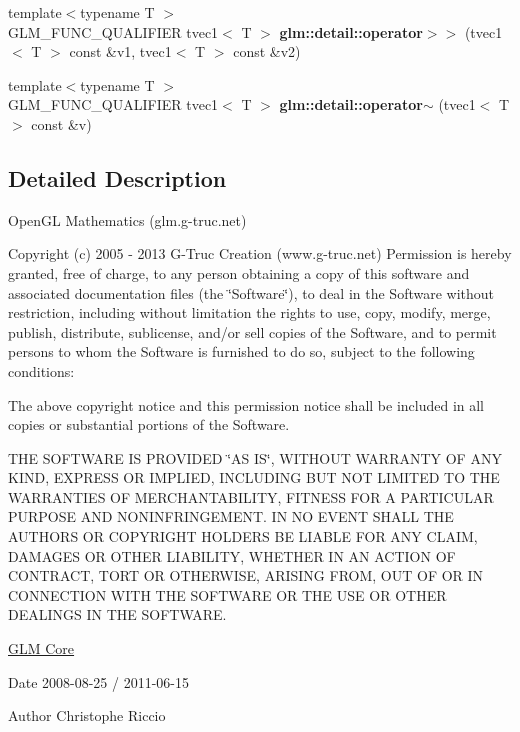 \begin{DoxyCompactItemize}
\item 
\hypertarget{namespaceglm_1_1detail_ac0a8c77debb2d3be29d2f966a35b8f29}{}{\footnotesize template$<$typename T $>$ }\\G\+L\+M\+\_\+\+F\+U\+N\+C\+\_\+\+Q\+U\+A\+L\+I\+F\+I\+E\+R tvec1$<$ T $>$ {\bfseries glm\+::detail\+::operator$>$$>$} (tvec1$<$ T $>$ const \&v1, tvec1$<$ T $>$ const \&v2)\label{namespaceglm_1_1detail_ac0a8c77debb2d3be29d2f966a35b8f29}

\item 
\hypertarget{namespaceglm_1_1detail_a6c38630bb9e02cd25d464e0fffc0e0cc}{}{\footnotesize template$<$typename T $>$ }\\G\+L\+M\+\_\+\+F\+U\+N\+C\+\_\+\+Q\+U\+A\+L\+I\+F\+I\+E\+R tvec1$<$ T $>$ {\bfseries glm\+::detail\+::operator$\sim$} (tvec1$<$ T $>$ const \&v)\label{namespaceglm_1_1detail_a6c38630bb9e02cd25d464e0fffc0e0cc}

\end{DoxyCompactItemize}


\subsection{Detailed Description}
Open\+G\+L Mathematics (glm.\+g-\/truc.\+net)

Copyright (c) 2005 -\/ 2013 G-\/\+Truc Creation (www.\+g-\/truc.\+net) Permission is hereby granted, free of charge, to any person obtaining a copy of this software and associated documentation files (the \char`\"{}\+Software\char`\"{}), to deal in the Software without restriction, including without limitation the rights to use, copy, modify, merge, publish, distribute, sublicense, and/or sell copies of the Software, and to permit persons to whom the Software is furnished to do so, subject to the following conditions\+:

The above copyright notice and this permission notice shall be included in all copies or substantial portions of the Software.

T\+H\+E S\+O\+F\+T\+W\+A\+R\+E I\+S P\+R\+O\+V\+I\+D\+E\+D \char`\"{}\+A\+S I\+S\char`\"{}, W\+I\+T\+H\+O\+U\+T W\+A\+R\+R\+A\+N\+T\+Y O\+F A\+N\+Y K\+I\+N\+D, E\+X\+P\+R\+E\+S\+S O\+R I\+M\+P\+L\+I\+E\+D, I\+N\+C\+L\+U\+D\+I\+N\+G B\+U\+T N\+O\+T L\+I\+M\+I\+T\+E\+D T\+O T\+H\+E W\+A\+R\+R\+A\+N\+T\+I\+E\+S O\+F M\+E\+R\+C\+H\+A\+N\+T\+A\+B\+I\+L\+I\+T\+Y, F\+I\+T\+N\+E\+S\+S F\+O\+R A P\+A\+R\+T\+I\+C\+U\+L\+A\+R P\+U\+R\+P\+O\+S\+E A\+N\+D N\+O\+N\+I\+N\+F\+R\+I\+N\+G\+E\+M\+E\+N\+T. I\+N N\+O E\+V\+E\+N\+T S\+H\+A\+L\+L T\+H\+E A\+U\+T\+H\+O\+R\+S O\+R C\+O\+P\+Y\+R\+I\+G\+H\+T H\+O\+L\+D\+E\+R\+S B\+E L\+I\+A\+B\+L\+E F\+O\+R A\+N\+Y C\+L\+A\+I\+M, D\+A\+M\+A\+G\+E\+S O\+R O\+T\+H\+E\+R L\+I\+A\+B\+I\+L\+I\+T\+Y, W\+H\+E\+T\+H\+E\+R I\+N A\+N A\+C\+T\+I\+O\+N O\+F C\+O\+N\+T\+R\+A\+C\+T, T\+O\+R\+T O\+R O\+T\+H\+E\+R\+W\+I\+S\+E, A\+R\+I\+S\+I\+N\+G F\+R\+O\+M, O\+U\+T O\+F O\+R I\+N C\+O\+N\+N\+E\+C\+T\+I\+O\+N W\+I\+T\+H T\+H\+E S\+O\+F\+T\+W\+A\+R\+E O\+R T\+H\+E U\+S\+E O\+R O\+T\+H\+E\+R D\+E\+A\+L\+I\+N\+G\+S I\+N T\+H\+E S\+O\+F\+T\+W\+A\+R\+E.

\hyperlink{group__core}{G\+L\+M Core}

\begin{DoxyDate}{Date}
2008-\/08-\/25 / 2011-\/06-\/15 
\end{DoxyDate}
\begin{DoxyAuthor}{Author}
Christophe Riccio 
\end{DoxyAuthor}
